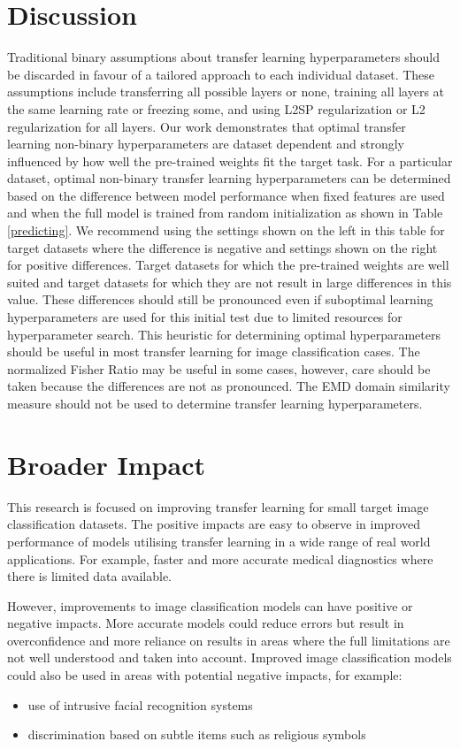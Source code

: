 \documentclass[]{article}
\begin{document}
\section{Discussion \label{subsec:discussion}} 
Traditional binary assumptions about transfer learning hyperparameters should be discarded in favour of a tailored approach to each individual dataset. These assumptions include transferring all possible layers or none, training all layers at the same learning rate or freezing some, and using L2SP regularization or L2 regularization for all layers. 
Our work demonstrates that optimal transfer learning non-binary hyperparameters are dataset dependent and strongly influenced by how well the pre-trained weights fit the target task. For a particular dataset, optimal non-binary transfer learning hyperparameters can be determined based on the difference between model performance when fixed features are used and when the full model is trained from random initialization as shown in Table \ref{predicting}. We recommend using the settings shown on the left in this table for target datasets where the difference is negative and settings shown on the right for positive differences. Target datasets for which the pre-trained weights are well suited and target datasets for which they are not result in large differences in this value. These differences should still be pronounced even if suboptimal learning hyperparameters are used for this initial test due to limited resources for hyperparameter search. This heuristic for determining optimal hyperparameters should be useful in most transfer learning for image classification cases. The normalized Fisher Ratio may be useful in some cases, however, care should be taken because the differences are not as pronounced. The EMD domain similarity measure should not be used to determine transfer learning hyperparameters.

\section{Broader Impact \label{impact}}
This research is focused on improving transfer learning for small target image classification datasets. The positive impacts are easy to observe in improved performance of models utilising transfer learning in a wide range of real world applications. For example, faster and more accurate medical diagnostics where there is limited data available. 

However, improvements to image classification models can have positive or negative impacts. More accurate models could reduce errors but result in overconfidence and more reliance on results in areas where the full limitations are not well understood and taken into account. Improved image classification models could also be used in areas with potential negative impacts, for example:
\begin{itemize}
\item use of intrusive facial recognition systems 
\item discrimination based on subtle items such as religious symbols
\end{itemize}
\end{document}
